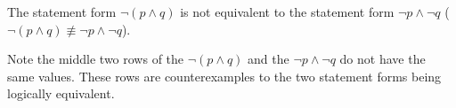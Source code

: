 \guard




\begin{exmp}
\label{exmp:naiveDeMorgans}
  The statement form $\neg(p\wedge q)$ is not equivalent to the statement form $\neg p \wedge \neg q$ ($\neg(p\wedge q) \not\equiv \neg p \wedge \neg q$).
  \begin{center}
    
  \end{center}
  Note the middle two rows of the $\neg(p\wedge q)$ and the $\neg p\wedge\neg q$ do not have the same values.
  These rows are counterexamples to the two statement forms being logically equivalent.
\end{exmp}
